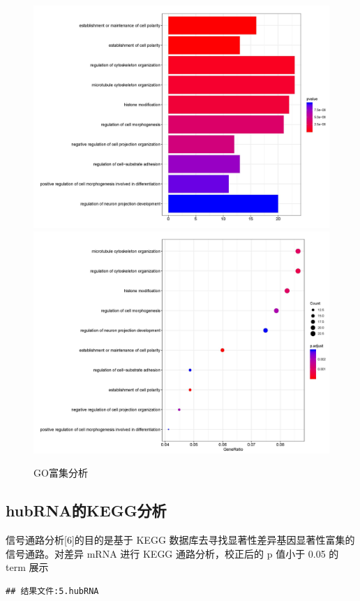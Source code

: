 \documentclass[
]{ctexart}
\begin{document}
\begin{figure}[H]

{\centering \includegraphics[width=0.48\linewidth]{./1.picture/ctrl_hubRNA_geneBPbar} \includegraphics[width=0.48\linewidth]{./1.picture/ctrl_hubRNA_geneBPdot} 

}

\caption{GO富集分析}\label{fig:unnamed-chunk-16}
\end{figure}

\hypertarget{hubrnaux7684keggux5206ux6790}{%
\subsection{hubRNA的KEGG分析}\label{hubrnaux7684keggux5206ux6790}}

信号通路分析{[}6{]}的目的是基于 KEGG 数据库去寻找显著性差异基因显著性富集的信号通路。对差异 mRNA 进行 KEGG 通路分析，校正后的 p 值小于 0.05 的 term 展示

\begin{verbatim}
## 结果文件:5.hubRNA
\end{verbatim}
\end{document}
